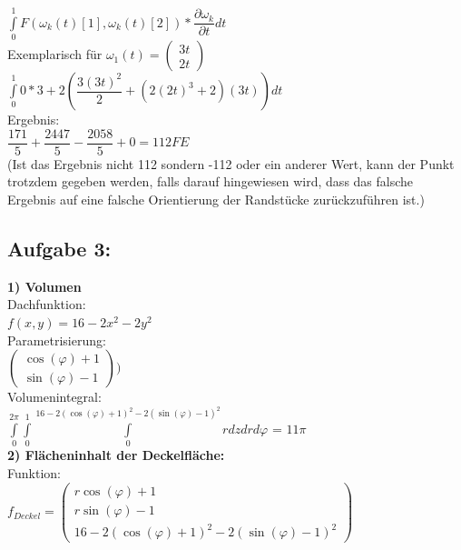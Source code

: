 \documentclass[11pt,final]{scrreprt}
\begin{document}
$\int\limits_0^1 F(\omega_k(t)[1],\omega_k(t)[2]) * \dfrac{\partial \omega_k}{\partial t} dt $\\

Exemplarisch für $\omega_1(t) = \left( \begin{matrix}
3t\\2t
\end{matrix}\right)$\\

$\int\limits_0^1 0*3 + 2\left(\dfrac{3(3t)^2}{2}+(2(2t)^3+2)(3t)\right) dt $\\

Ergebnis:\\

$ \dfrac{171}{5} + \dfrac{2447}{5} - \dfrac{2058}{5} + 0 = 112 FE $\\
(Ist das Ergebnis nicht 112 sondern -112 oder ein anderer Wert, kann der Punkt trotzdem gegeben werden, falls darauf hingewiesen wird, dass das falsche Ergebnis auf eine falsche Orientierung der Randstücke zurückzuführen ist.)\\

\subsection{Aufgabe 3:}

\textbf{1) Volumen}\\

Dachfunktion:\\
$f(x, y)=16-2x^2-2y^2$\\
Parametrisierung:\\
$ \left(\begin{matrix}
\cos(\varphi)+1\\\sin(\varphi)-1
\end{matrix}\right)) $\\

Volumenintegral:\\
$ \int\limits_{0}^{2\pi}\int\limits_{0}^{1}\int\limits_{0}^{16-2(\cos(\varphi)+1)^2-2(\sin(\varphi)-1)^2} r dzdrd\varphi $ = $11\pi$\\

\textbf{2) Flächeninhalt der Deckelfläche:}\\

Funktion:\\
$f_{Deckel} = \left( \begin{matrix}
r\cos(\varphi)+1\\r\sin(\varphi)-1\\16-2(\cos(\varphi)+1)^2-2(\sin(\varphi)-1)^2
\end{matrix} \right)$\\
\end{document}
